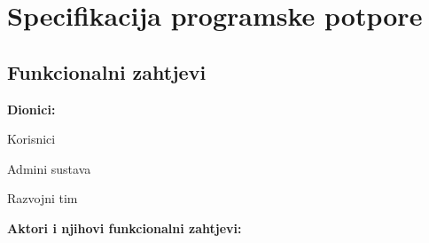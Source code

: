 \chapter{Specifikacija programske potpore}
		
	\section{Funkcionalni zahtjevi}
			
			\noindent \textbf{Dionici:}
			
			\begin{packed_enum}
				
				\item Korisnici
				\item Admini sustava				
				\item Razvojni tim
				
			\end{packed_enum}
			
			\noindent \textbf{Aktori i njihovi funkcionalni zahtjevi:}
			
